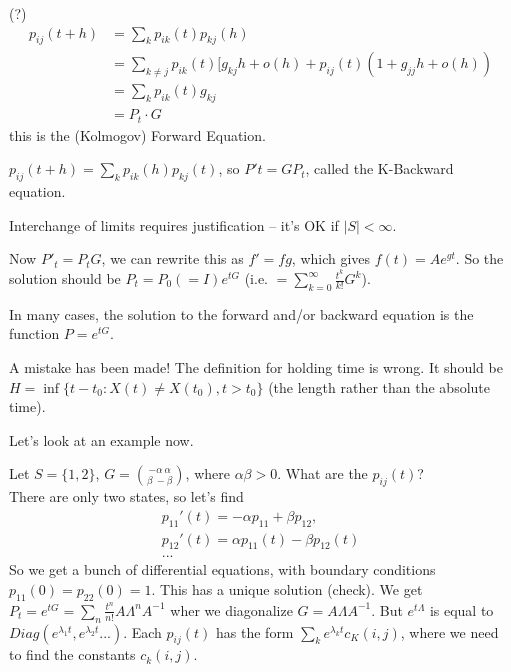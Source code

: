 \documentclass[a4paper]{article}
\begin{document}
(?)
\begin{equation*}
\begin{aligned}
p_{ij}(t+h) &= \sum_k p_{ik}(t) p_{kj}(h)\\
&= \sum_{k \neq j} p_{ik}(t) [g_{kj} h + o(h) + p_{ij}(t) (1+g_{jj} h + o(h))\\
&= \sum_k p_{ik} (t) g_{kj}\\
&= P_t \cdot G
\end{aligned}
\end{equation*}
this is the (Kolmogov) Forward Equation.

$p_{ij}(t+h) = \sum_k p_{ik}(h) p_{kj}(t)$, so $P't = GP_t$, called the K-Backward equation.

Interchange of limits requires justification -- it's OK if $|S| < \infty$.

Now $P'_t = P_t G$, we can rewrite this as $f'=fg$, which gives $f(t) = A e^{gt}$. So the solution should be $P_t = P_0(=I)e^{tG}$ (i.e. $=\sum_{k=0}^\infty \frac{t^k}{k!} G^k$).

In many cases, the solution to the forward and/or backward equation is the function $P=e^{tG}$.

A mistake has been made! The definition for holding time is wrong. It should be $H=\inf\{ t-t_0: X(t) \neq X(t_0), t > t_0\}$ (the length rather than the absolute time).

Let's look at an example now.
\begin{eg}
Let $S=\{1,2\}$, $G={{-\alpha \ \alpha} \choose {\beta \ -\beta}}$, where $\alpha\beta > 0$. What are the $p_{ij}(t)$?\\
There are only two states, so let's find
\begin{equation*}
\begin{aligned}
p_{11}'(t) = -\alpha p_{11} + \beta p_{12},\\
p_{12}'(t) = \alpha p_{11}(t) - \beta p_{12}(t)\\
...
\end{aligned}
\end{equation*}
So we get a bunch of differential equations, with boundary conditions $p_{11}(0) = p_{22}(0) =1$. This has a unique solution (check). We get $P_t = e^{tG} =\sum_n \frac{t^n}{n!} A \Lambda^n A^{-1}$ wher we diagonalize $G=A\Lambda A^{-1}$. But $e^{t\Lambda}$ is equal to $Diag(e^{\lambda_1 t}, e^{\lambda_2 t} ...)$. Each $p_{ij}(t)$ has the form $\sum_k e^{\lambda_k t} c_K (i,j)$, where we need to find the constants $c_k(i,j)$.
\end{eg}
\end{document}
